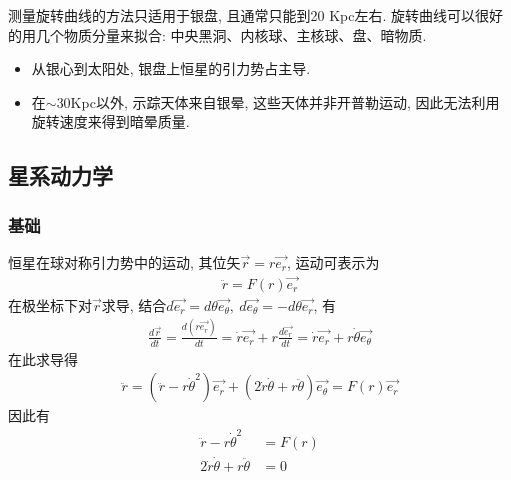 测量旋转曲线的方法只适用于银盘, 且通常只能到20 Kpc左右. 旋转曲线可以很好的用几个物质分量来拟合: 中央黑洞、内核球、主核球、盘、暗物质. 
\begin{itemize}\small
    \item 从银心到太阳处, 银盘上恒星的引力势占主导. 
    \item 在$\sim$30Kpc以外, 示踪天体来自银晕, 这些天体并非开普勒运动, 因此无法利用旋转速度来得到暗晕质量. 
\end{itemize}

\subsection{星系动力学}

\subsubsection{基础}
\begin{figure}[!htb]
    \centering
\end{figure}

恒星在球对称引力势中的运动, 其位矢$\vec{r}=r\vec{e_r}$, 运动可表示为
\begin{align*}
    \ddot{r}=F(r)\vec{e_r}
\end{align*}
在极坐标下对$\vec{r}$求导, 结合$d\vec{e_r}=d\theta\vec{e_\theta},\ d\vec{e_\theta}=-d\theta\vec{e_r}$, 有
\begin{align*}
    \frac{d\vec{r}}{dt}=\frac{d(r\vec{e_r})}{dt}=\dot{r}\vec{e_r}+r\frac{d\vec{e_r}}{dt}=\dot{r}\vec{e_r}+r\dot{\theta}\vec{e_\theta}
\end{align*}
在此求导得
\begin{align*}
    \ddot{r}=(\ddot{r}-r\dot{\theta}^2)\vec{e_r}+(2\dot{r}\dot{\theta}+r\ddot{\theta})\vec{e_\theta}=F(r)\vec{e_r}
\end{align*}
因此有
\begin{align}
    \ddot{r}-r\dot{\theta}^2&=F(r) \label{C1} \\ 
    2\dot{r}\dot{\theta}+r\ddot{\theta}&=0 \label{C2}
\end{align}

